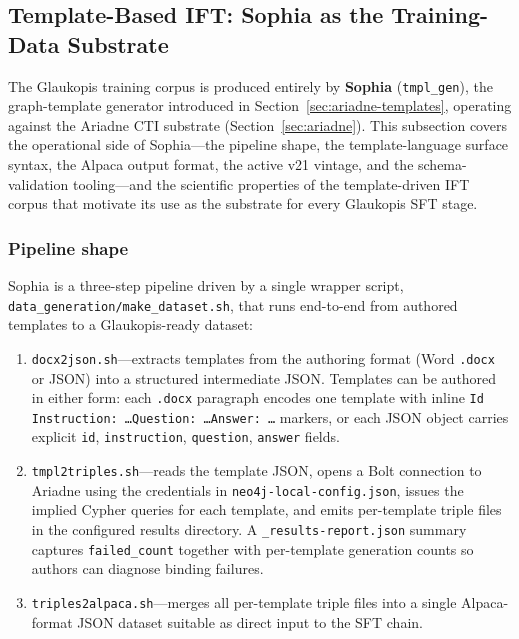 \documentclass[unnumsec,webpdf,contemporary,large]{oup-authoring-template}
\theoremstyle{thmstyleone}
\theoremstyle{thmstyletwo}
\theoremstyle{thmstylethree}
\begin{document}
\subsection{Template-Based IFT: Sophia as the Training-Data Substrate}
\label{sec:glaukopis-template}

The Glaukopis training corpus is produced entirely by \textbf{Sophia} (\texttt{tmpl\_gen}), the graph-template generator introduced in Section~\ref{sec:ariadne-templates}, operating against the Ariadne CTI substrate (Section~\ref{sec:ariadne}). This subsection covers the operational side of Sophia---the pipeline shape, the template-language surface syntax, the Alpaca output format, the active v21 vintage, and the schema-validation tooling---and the scientific properties of the template-driven IFT corpus that motivate its use as the substrate for every Glaukopis SFT stage.

\subsubsection*{Pipeline shape}
Sophia is a three-step pipeline driven by a single wrapper script, \texttt{data\_generation/make\_dataset.sh}, that runs end-to-end from authored templates to a Glaukopis-ready dataset:

\begin{enumerate}
  \item \texttt{docx2json.sh}---extracts templates from the authoring format (Word \texttt{.docx} or JSON) into a structured intermediate JSON. Templates can be authored in either form: each \texttt{.docx} paragraph encodes one template with inline \texttt{Id Instruction: \ldots Question: \ldots Answer: \ldots} markers, or each JSON object carries explicit \texttt{id}, \texttt{instruction}, \texttt{question}, \texttt{answer} fields.
  \item \texttt{tmpl2triples.sh}---reads the template JSON, opens a Bolt connection to Ariadne using the credentials in \texttt{neo4j-local-config.json}, issues the implied Cypher queries for each template, and emits per-template triple files in the configured results directory. A \texttt{\_results-report.json} summary captures \texttt{failed\_count} together with per-template generation counts so authors can diagnose binding failures.
  \item \texttt{triples2alpaca.sh}---merges all per-template triple files into a single Alpaca-format JSON dataset suitable as direct input to the SFT chain.
\end{enumerate}
\end{document}
